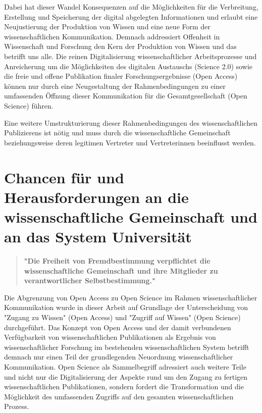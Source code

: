 Dabei hat dieser Wandel Konsequenzen auf die Möglichkeiten für die Verbreitung, Erstellung und Speicherung der digital abgelegten Informationen und erlaubt eine Neujustierung der Produktion von Wissen und eine neue Form der wissenschaftlichen Kommunikation. Demnach addressiert Offenheit in Wissenschaft und Forschung den Kern der Produktion von Wissen und das betrifft uns alle. \cite{Mussell_2013} Die reinen Digitalisierung wissenschaftlicher Arbeitsprozesse und Anreicherung um die Möglichkeiten des digitalen Austauschs (Science 2.0) sowie die freie und offene Publikation finaler Forschungsergebnisse (Open Access) können nur durch eine Neugestaltung der Rahmenbedingungen zu einer umfassenden Öffnung dieser Kommunikation für die Gesamtgesellschaft (Open Science) führen.

Eine weitere Umstrukturierung dieser Rahmenbedingungen des wissenschaftlichen Publizierens ist nötig \cite{naeder_2010_open} und muss durch die wissenschaftliche Gemeinschaft beziehungsweise deren legitimen Vertreter und Vertreterinnen beeinflusst werden.

\section{Chancen für und Herausforderungen an die wissenschaftliche Gemeinschaft und an das System Universität}

\begin{quote}
\textbf{"Die Freiheit von Fremdbestimmung verpflichtet die wissenschaftliche Gemeinschaft und ihre Mitglieder zu verantwortlicher Selbstbestimmung."}
\end{quote} \cite{Oezmen_2015}

Die Abgrenzung von Open Access zu Open Science im Rahmen wissenschaftlicher Kommunikation wurde in dieser Arbeit auf Grundlage der Unterscheidung von "Zugang zu Wissen" (Open Access) und "Zugriff auf Wissen" (Open Science) durchgeführt. Das Konzept von Open Access und der damit verbundenen Verfügbarkeit von wissenschaftlichen Publikationen als Ergebnis von wissenschaftlicher Forschung im bestehenden wissenschaftlichen System betrifft demnach nur einen Teil der grundlegenden Neuordnung wissenschaftlicher Kommunikation. Open Science als Sammelbegriff adressiert auch weitere Teile und nicht nur die Digitalisierung der Aspekte rund um den Zugang zu fertigen wissenschaftlichen Publikationen, sondern fordert die Transformation und die Möglichkeit des umfassenden Zugriffs auf den gesamten wissenschaftlichen Prozess.

